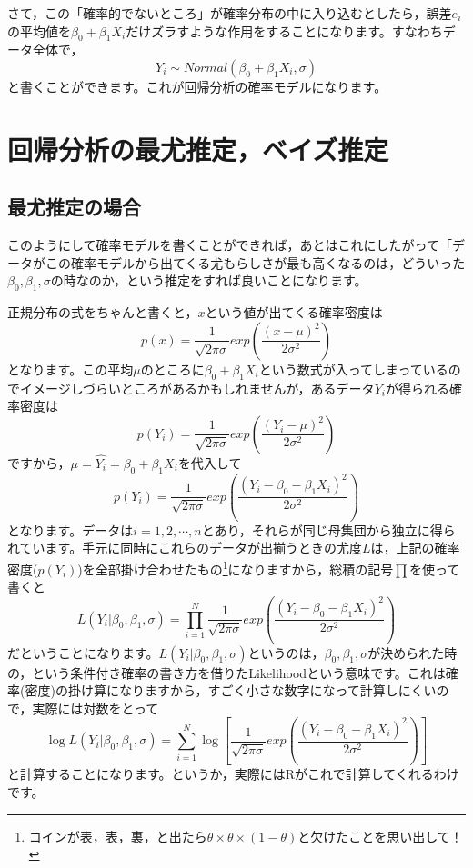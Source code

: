 \documentclass{ltjsarticle}
\begin{document}
さて，この「確率的でないところ」が確率分布の中に入り込むとしたら，誤差$e_i$の平均値を$\beta_0 + \beta_1 X_i$だけズラすような作用をすることになります。すなわちデータ全体で，
$$ Y_i \sim Normal(\beta_0 + \beta_1 X_i , \sigma)$$
と書くことができます。これが回帰分析の確率モデルになります。

\section{回帰分析の最尤推定，ベイズ推定}
\subsection{最尤推定の場合}
このようにして確率モデルを書くことができれば，あとはこれにしたがって「データがこの確率モデルから出てくる尤もらしさが最も高くなるのは，どういった$\beta_0, \beta_1, \sigma$の時なのか，という推定をすれば良いことになります。

正規分布の式をちゃんと書くと，$x$という値が出てくる確率密度は
$$ p(x) = \frac{1}{\sqrt{2\pi \sigma}}exp\left( \frac{(x-\mu)^2}{2\sigma^2}\right)$$
となります。この平均$\mu$のところに$\beta_0 + \beta_1 X_i$という数式が入ってしまっているのでイメージしづらいところがあるかもしれませんが，あるデータ$Y_i$が得られる確率密度は
$$ p(Y_i) = \frac{1}{\sqrt{2\pi \sigma}}exp\left( \frac{(Y_i-\mu)^2}{2\sigma^2}\right)$$
ですから，$\mu=\hat{Y_i} = \beta_0 + \beta_1 X_i$を代入して
$$ p(Y_i) = \frac{1}{\sqrt{2\pi \sigma}}exp\left( \frac{(Y_i-\beta_0 - \beta_1 X_i)^2}{2\sigma^2}\right)$$
となります。データは$i = 1,2,\cdots,n$とあり，それらが同じ母集団から独立に得られています。手元に同時にこれらのデータが出揃うときの尤度$L$は，上記の確率密度($p(Y_i)$)を全部掛け合わせたもの\footnote{コインが表，表，裏，と出たら$\theta \times \theta \times (1-\theta)$と欠けたことを思い出して！}になりますから，総積の記号$\prod$を使って書くと
$$ L(Y_i | \beta_0,\beta_1,\sigma) = \prod_{i=1}^N \frac{1}{\sqrt{2\pi \sigma}}exp\left( \frac{(Y_i-\beta_0 - \beta_1 X_i)^2}{2\sigma^2}\right)$$
だということになります。$L(Y_i | \beta_0,\beta_1,\sigma) $というのは，$\beta_0,\beta_1,\sigma$が決められた時の，という条件付き確率の書き方を借りたLikelihoodという意味です。これは確率(密度)の掛け算になりますから，すごく小さな数字になって計算しにくいので，実際には対数をとって
$$ \log L(Y_i | \beta_0,\beta_1,\sigma) = \sum_{i=1}^N \log \left[ \frac{1}{\sqrt{2\pi \sigma}}exp\left( \frac{(Y_i-\beta_0 - \beta_1 X_i)^2}{2\sigma^2}\right)\right]$$
と計算することになります。というか，実際にはRがこれで計算してくれるわけです。
\end{document}
